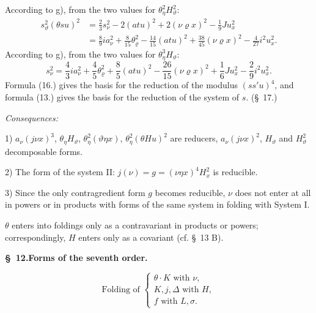 \documentclass[11pt]{article}
\newcommand{\A}{\Delta}
\newcommand{\R}{\varrho}
\begin{document}
According to g), from the two values for $\theta_\eta^2H_\vartheta^2$:
\[
\tag{15}
\begin{aligned}
s_\vartheta^2(\theta su)^2
&=\frac23s_\nu^2-2(atu)^2+2(\nu\R x)^2-\frac19Ju_x^2\\
&=\frac89ia_\nu^2+\frac8{15}\theta_\R^2-\frac{14}{15}(atu)^2+\frac{38}{45}(\nu\R x)^2-\frac4{27}i^2u_x^2.
\end{aligned}
\]
According to g), from the two values for $\theta_\eta^3H_\vartheta$:
\[
\tag{16}
s_\nu^2=\frac43ia_\nu^2+\frac45\theta_\R^2+\frac85(atu)^2-\frac{26}{15}(\nu\R x)^2+\frac16Ju_x^2-\frac29i^2u_x^2.
\]
Formula (16.) gives the basis for the reduction of the modulus $(ss'u)^4$, and formula (13.) gives the basis for the reduction of the system of $s$. (\S\ 17.)

\noindent\emph{Consequences:}

1) $a_\nu(j\nu x)^3$, $\theta_\eta H_\vartheta$, $\theta_\eta^2(\vartheta\eta x)$, $\theta_\eta^2(\theta Hu)^2$ are reducers, $a_\nu(j\nu x)^2$, $H_\vartheta$ and $H_\vartheta^2$ decomposable forms.

2) The form of the system II: $j(\nu)=g=(\nu\eta x)^4H_x^2$ is reducible.

3) Since the only contragredient form $g$ becomes reducible, $\nu$ does not enter at all in powers or in products with forms of the same system in folding with System I.

$\theta$ enters into foldings only as a contravariant in products or powers; correspondingly, $H$ enters only as a covariant (cf. \S\ 13 B).

\begin{center}
\textbf{\S\ 12.\quad Forms of the seventh order.}
\end{center}
\[
\text{Folding of }\left\{\begin{array}{l}
\theta\cdot K\text{ with }\nu,\\
K,j,\A\text{ with }H,\\
f\text{ with }L,\sigma.
\end{array}\right.
\]
\end{document}
